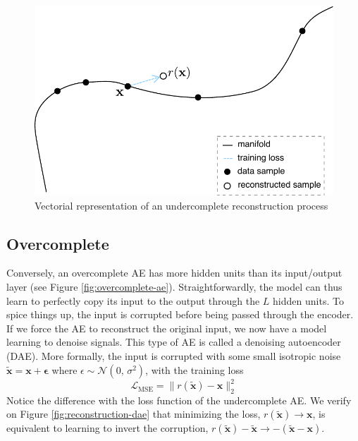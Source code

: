 \begin{figure}[!h]
\centering
\includegraphics[scale=0.55]{figures/reconstruction}
\caption[Vectorial representation of undercomplete AE]{Vectorial representation of an undercomplete reconstruction process}
\label{fig:reconstruction}
\end{figure}

\subsection*{Overcomplete}\label{sec:overcomplete}
Conversely, an overcomplete AE has more hidden units than its input/output layer (see Figure \ref{fig:overcomplete-ae}). Straightforwardly, the model can thus learn to perfectly copy its input to the output through the $L$ hidden units. To spice things up, the input is corrupted before being passed through the encoder. If we force the AE to reconstruct the original input, we now have a model learning to denoise signals. This type of AE is called a denoising autoencoder (DAE). More formally, the input is corrupted with some small isotropic noise $\tilde{\mathbf{x}} = \mathbf{x} + \mathbf{\epsilon}$ where $\epsilon \sim \mathcal{N}(0,\,\sigma^{2})$, with the training loss 
\begin{equation}
\mathcal{L}_{\text{MSE}} = \lVert r(\tilde{\mathbf{x}}) - \mathbf{x} \rVert_2^2
\end{equation}
Notice the difference with the loss function of the undercomplete AE. We verify on Figure \ref{fig:reconstruction-dae} that minimizing the loss, $r(\tilde{\mathbf{x}}) \rightarrow \mathbf{x}$, is equivalent to learning to invert the corruption, $r(\tilde{\mathbf{x}}) - \tilde{\mathbf{x}} \rightarrow -(\tilde{\mathbf{x}} - \mathbf{x})$.

